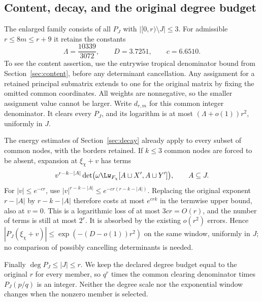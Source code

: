 \subsection{Content, decay, and the original degree budget}
The enlarged family consists of all $P_J$ with $|[0,r)\setminus J|\le3$.
For admissible $r\le8m\le r+9$ it retains the constants
\[
 \Lambda=\frac{10339}{3072},\qquad D=3.7251,\qquad c=6.6510.
\]
To see the content assertion, use the entrywise tropical denominator
bound from Section~\ref{sec:content}, before any determinant cancellation.
Any assignment for a retained principal submatrix extends to one for
the original matrix by fixing the omitted common coordinates. All
weights are nonnegative, so the smaller assignment value cannot be
larger. Write $d_{r,m}$ for this common integer denominator. It clears every $P_J$, and
its logarithm is at most $(\Lambda+o(1))r^2$, uniformly in $J$.

The energy estimates of Section~\ref{sec:decay} already apply to every
subset of common nodes, with the borders retained. If $k\le3$ common
nodes are forced to be absent, expansion at $\xi_\chi+v$ has terms
\[
 v^{r-k-|A|}\det\bigl(\omega\Lw_{F_\chi}[A\sqcup X',A\sqcup Y']\bigr),
 \qquad A\subseteq J.
\]
For $|v|\le e^{-cr}$, use
$|v|^{r-k-|A|}\le e^{-cr(r-k-|A|)}$. Replacing the original exponent
$r-|A|$ by $r-k-|A|$ therefore costs at most $e^{crk}$ in the termwise
upper bound, also at $v=0$. This is
a logarithmic loss of at most $3cr=O(r)$, and the number of terms is
still at most $2^r$. It is absorbed by the existing $o(r^2)$ errors.
Hence $|P_J(\xi_\chi+v)|\le\exp(-(D-o(1))r^2)$ on the same window,
uniformly in $J$; no comparison of possibly cancelling determinants is
needed.

Finally $\deg P_J\le|J|\le r$. We keep the declared degree budget equal
to the original $r$ for every member, so $q^r$ times the common clearing
denominator times $P_J(p/q)$ is an integer. Neither the degree scale nor
the exponential window changes when the nonzero member is selected.
